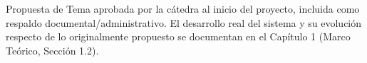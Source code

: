 \label{anexo:propuesta}

Propuesta de Tema aprobada por la cátedra al inicio del proyecto, incluida como respaldo documental/administrativo. El desarrollo real del sistema y su evolución respecto de lo originalmente propuesto se documentan en el Capítulo 1 (Marco Teórico, Sección 1.2).

\clearpage
\thispagestyle{empty}
{\hoffset=0pt\voffset=0pt
}
\clearpage
